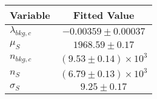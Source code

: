 \begin{tabular}[t]{lc}
\hline
Variable &Fitted Value\\
\hline\hline
$\lambda_{bkg,c}$&$-0.00359\pm0.00037$\\
\hline
$\mu_{S}$&$1968.59\pm0.17$\\
\hline
$n_{bkg,c}$&$(9.53\pm0.14)\times 10^3$\\
\hline
$n_{S}$&$(6.79\pm0.13)\times 10^3$\\
\hline
$\sigma_{S}$&$9.25\pm0.17$\\
\hline
\end{tabular}